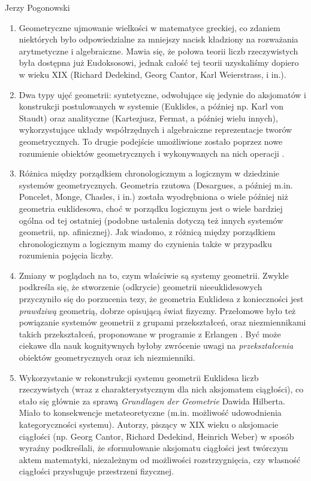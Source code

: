 \begin{newrevengenv}{Jerzy Pogonowski}
\begin{enumerate}

\item Geometryczne ujmowanie wielkości w matematyce greckiej, co
zdaniem niektórych było odpowiedzialne za mniejszy nacisk
kładziony na rozważania arytmetyczne i algebraiczne. Mawia się, że
połowa teorii liczb rzeczywistych była dostępna już Eudoksosowi,
jednak całość tej teorii uzyskaliśmy dopiero w wieku XIX (Richard
Dedekind, Georg Cantor, Karl Weierstrass, i in.).

\item Dwa typy ujęć geometrii: syntetyczne, odwołujące się jedynie
do aksjomatów i konstrukcji postulowanych w systemie (Euklides, a
później np. Karl von Staudt) oraz analityczne (Kartezjusz, Fermat,
a później wielu innych), wykorzystujące układy współrzędnych i
algebraiczne reprezentacje tworów geometrycznych. To drugie
podejście umożliwione zostało poprzez nowe rozumienie obiektów
geometrycznych i wykonywanych na nich operacji \parencite{descartes_geometria_2015}.

\item Różnica między porządkiem chronologicznym a logicznym w
dziedzinie systemów geometrycznych. Geometria rzutowa (Desargues,
a później m.in. Poncelet, Monge, Chasles, i in.) została
wyodrębniona o wiele później niż geometria euklidesowa, choć w
porządku logicznym jest o wiele bardziej ogólna od tej ostatniej
(podobne ustalenia dotyczą też innych systemów geometrii, np.
afinicznej). Jak wiadomo, z różnicą między porządkiem
chronologicznym a logicznym mamy do czynienia także w przypadku
rozumienia pojęcia liczby.

\item Zmiany w poglądach na to, czym właściwie są systemy
geometrii. Zwykle podkreśla się, że stworzenie (odkrycie)
geometrii nieeuklidesowych przyczyniło się do porzucenia tezy, że
geometria Euklidesa z konieczności jest {\em prawdziwą} geometrią,
dobrze opisującą świat fizyczny. Przełomowe było też powiązanie
systemów geometrii z grupami przekształceń, oraz niezmiennikami
takich przekształceń, proponowane w programie z Erlangen \parencite{klein_vergleichende_1872}. Być może ciekawe dla nauk kognitywnych byłoby zwrócenie
uwagi na {\em przekształcenia} obiektów geometrycznych oraz ich
niezmienniki.

\item Wykorzystanie w rekonstrukcji systemu geometrii Euklidesa
liczb rzeczywistych (wraz z charakterystycznym dla nich aksjomatem
ciągłości), co stało się głównie za sprawą {\em Grundlagen der
Geometrie} \parencite*{hilbert_grundlagen_1899} Dawida Hilberta. Miało to konsekwencje
metateoretyczne (m.in. możliwość udowodnienia kategoryczności
systemu). Autorzy, piszący w XIX wieku o aksjomacie ciągłości (np.
Georg Cantor, Richard Dedekind, Heinrich Weber) w sposób wyraźny
podkreślali, że sformułowanie aksjomatu ciągłości jest twórczym
aktem matematyki, niezależnym od możliwości rozstrzygnięcia, czy
własność ciągłości przysługuje przestrzeni fizycznej.


\end{enumerate}
\end{newrevengenv}
